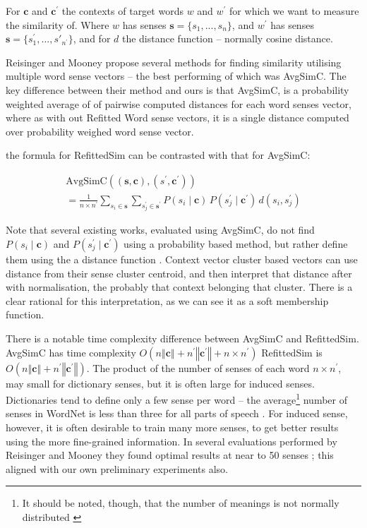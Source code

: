 \documentclass{sig-alternate}
\renewcommand{\c}{\mathbf{c}}
\newcommand{\s}{\mathbf{s}}
\begin{document}
For $\c$ and $\c^\prime$ the contexts of target words $w$ and $w^\prime$ for which we want to measure the similarity of. Where $w$ has senses $\s=\{s_1,...,s_n\}$, and $w^\prime$ has senses $\s=\{s^\prime_1,...,s\prime_{n^\prime}\}$, and for $d$ the distance function -- normally cosine distance.

Reisinger and Mooney \parencite{Reisinger2010} propose several methods for finding similarity utilising multiple word sense vectors -- the best performing of which was AvgSimC.
The key difference between their method and ours is that AvgSimC, is a probability weighted average of of pairwise computed distances for each word senses vector,
where as with out Refitted Word sense vectors, it is a single distance computed over probability weighed word sense vector.

the formula for RefittedSim  can be contrasted with that for AvgSimC:


\begin{multline}
	\mathrm{AvgSimC}((\s,\c),(s^{\prime},\c^{\prime})) \\
	=  \frac{1}{n \times n^{\prime}}
	\sum_{s_{i}\in\s}
	\sum_{s_{j}^{\prime}\in\s^{\prime}}
	P(s_{i}\mid\c)\,P(s_{j}^{\prime}\mid\c^{\prime})\,d(s_{i},s_{j}^{\prime})
\end{multline}


Note that several existing works, evaluated using AvgSimC, do not find $P(s_{i}\mid\c)$ and $P(s_{j}^{\prime}\mid\c^\prime)$ using a probability based method, but rather define them using the a distance function \parencite{Reisinger2010, Huang2012}. Context vector cluster based vectors can use distance from their sense cluster centroid, and then interpret that distance after with normalisation, the probably that context belonging that cluster. There is a clear rational for this interpretation, as we can see it as a soft membership function. 


There is a notable time complexity difference between AvgSimC and RefittedSim.
AvgSimC has time complexity $O(n\left\Vert \c\right\Vert +n^{\prime}\left\Vert \c^{\prime}\right\Vert +n\times n^{\prime})$
RefittedSim is $O(n\left\Vert \c\right\Vert +n^{\prime}\left\Vert \c^{\prime}\right\Vert)$.
The product of the number of senses of each word $n \times n^\prime$, may small for dictionary senses, but it is often large for induced senses. Dictionaries tend to define only a few sense per word -- the average\footnote{It should be noted, though, that the number of meanings is not normally distributed \parencite{zipf1945meaning}} number of senses in WordNet is less than three for all parts of speech \parencite{miller1995wordnet}. For induced sense, however, it is often desirable to train many more senses, to get better results using the more fine-grained information. In several evaluations performed by Reisinger and Mooney they found optimal results at near to 50 senses \parencite{Reisinger2010}; this aligned with our own preliminary experiments also.
\end{document}
